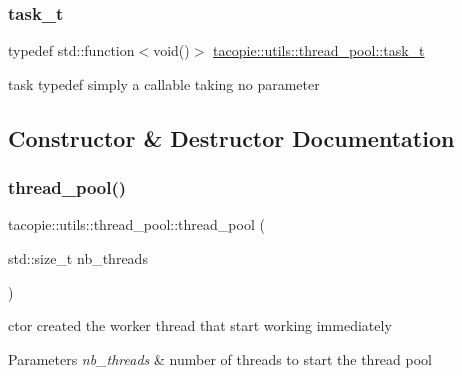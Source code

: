 \subsubsection{\texorpdfstring{task\+\_\+t}{task\_t}}
{\footnotesize\ttfamily typedef std\+::function$<$void()$>$ \hyperlink{classtacopie_1_1utils_1_1thread__pool_a8ae8886fdeaa8e5c0abad12626a47296}{tacopie\+::utils\+::thread\+\_\+pool\+::task\+\_\+t}}

task typedef simply a callable taking no parameter 

\subsection{Constructor \& Destructor Documentation}
\mbox{\label{classtacopie_1_1utils_1_1thread__pool_aa0068f000b8ecb21b2b0a0c50f77877c}} 
\subsubsection{\texorpdfstring{thread\+\_\+pool()}{thread\_pool()}\hspace{0.1cm}{\footnotesize\ttfamily [1/2]}}
{\footnotesize\ttfamily tacopie\+::utils\+::thread\+\_\+pool\+::thread\+\_\+pool (\begin{DoxyParamCaption}\item[{std\+::size\+\_\+t}]{nb\+\_\+threads }\end{DoxyParamCaption})\hspace{0.3cm}{\ttfamily [explicit]}}

ctor created the worker thread that start working immediately


\begin{DoxyParams}{Parameters}
{\em nb\+\_\+threads} & number of threads to start the thread pool \\
\hline
\end{DoxyParams}
\mbox{\label{classtacopie_1_1utils_1_1thread__pool_accddfc6fad613b0c6d407028799abfc5}} 
